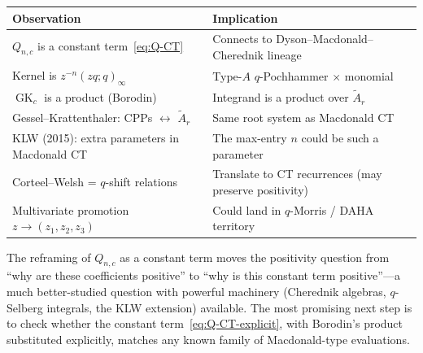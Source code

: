 \documentclass[11pt]{article}
\newcommand{\GK}{\operatorname{GK}}
\begin{document}
\begin{center}
\begin{tabular}{l|l}
  \textbf{Observation} & \textbf{Implication} \\
  \hline
  $Q_{n,c}$ is a constant term~\eqref{eq:Q-CT}
    & Connects to Dyson--Macdonald--Cherednik lineage \\
  Kernel is $z^{-n}(zq;q)_\infty$
    & Type-$A$ $q$-Pochhammer $\times$ monomial \\
  $\GK_c$ is a product (Borodin)
    & Integrand is a product over $\widetilde{A}_r$ \\
  Gessel--Krattenthaler: CPPs $\leftrightarrow$ $\widetilde{A}_r$
    & Same root system as Macdonald CT \\
  KLW (2015): extra parameters in Macdonald CT
    & The max-entry $n$ could be such a parameter \\
  Corteel--Welsh = $q$-shift relations
    & Translate to CT recurrences (may preserve positivity) \\
  Multivariate promotion $z \to (z_1, z_2, z_3)$
    & Could land in $q$-Morris / DAHA territory
\end{tabular}
\end{center}

\medskip

The reframing of $Q_{n,c}$ as a constant term moves the
positivity question from ``why are these coefficients positive''
to ``why is this constant term positive''---a much
better-studied question with powerful machinery
(Cherednik algebras, $q$-Selberg integrals, the KLW
extension) available. The most promising next step is to check
whether the constant term~\eqref{eq:Q-CT-explicit}, with
Borodin's product substituted explicitly, matches any known
family of Macdonald-type evaluations.

\end{document}
